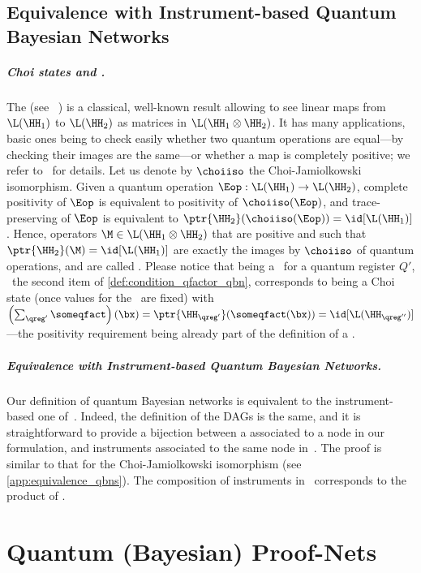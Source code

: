 \subsection{Equivalence with Instrument-based Quantum Bayesian Networks}
\label{sec:choi_iso}

\subparagraph{Choi states and \qCPTs.}

The  (see \eg~\cite{Watrous_book}) is a classical, well-known result allowing to see linear maps from $\L(\HH_1)$ to $\L(\HH_2)$ as matrices in $\L(\HH_1 \otimes \HH_2)$.
It has many applications, basic ones being to check easily whether two quantum operations are equal---by checking their images are the same---or whether a map is completely positive; we refer to~\cite{Watrous_book} for details.
Let us denote by $\choiiso$ the Choi-Jamiolkowski isomorphism.
Given a quantum operation $\Eop : \L(\HH_1) \to \L(\HH_2)$, complete positivity of $\Eop$ is equivalent to positivity of $\choiiso(\Eop)$, and trace-preserving of $\Eop$ is equivalent to $\ptr{\HH_2}(\choiiso(\Eop)) = \id[\L(\HH_1)]$.
Hence, operators $\M\in\L(\HH_1 \otimes \HH_2)$ that are positive and such that $\ptr{\HH_2}(\M) = \id[\L(\HH_1)]$ are exactly the images by $\choiiso$ of quantum operations, and are called .
Please notice that being a \qCPT\ for a quantum register $Q'$, \ie\ the second item of \cref{def:condition_qfactor_qbn}, corresponds to being a Choi state (once values for the \rvs\ are fixed) with $\left(\sum_{\qreg'} \someqfact\right)(\bx) = \ptr{\HH_{\qreg'}}(\someqfact(\bx)) = \id[\L(\HH_{\qreg''})]$---the positivity requirement being already part of the definition of a \Qfactor.

\subparagraph{Equivalence with Instrument-based Quantum Bayesian Networks.}

Our definition of %
quantum Bayesian networks is equivalent to the instrument-based one of~\cite{GBN2014}.
Indeed, the definition of the DAGs is the same, and it is straightforward to provide a bijection between a \qCPT associated to a node in our formulation, and instruments associated to the same node in~\cite{GBN2014}.
The proof is similar to that for the Choi-Jamiolkowski isomorphism (see \cref{app:equivalence_qbns}).
The composition of instruments in~\cite{GBN2014} corresponds to the product of \qCPTs.


\section{Quantum (Bayesian) Proof-Nets}
\label{sec:qpns}

